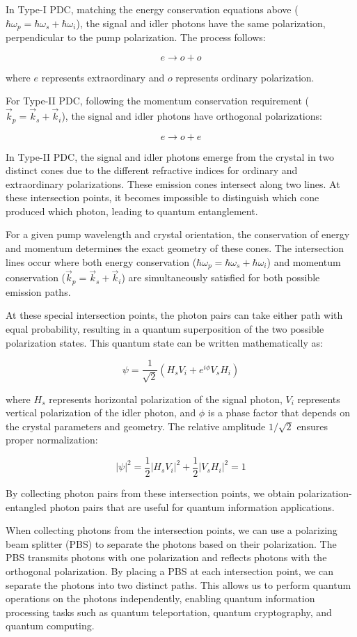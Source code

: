 \documentclass[
  a4paper,
]{book}
\begin{document}
In Type-I PDC, matching the energy conservation equations above
(\(\hbar\omega_p = \hbar\omega_s + \hbar\omega_i\)), the signal and
idler photons have the same polarization, perpendicular to the pump
polarization. The process follows:

\[
e \rightarrow o + o
\]

where \(e\) represents extraordinary and \(o\) represents ordinary
polarization.

For Type-II PDC, following the momentum conservation requirement
(\(\vec{k}_p = \vec{k}_s + \vec{k}_i\)), the signal and idler photons
have orthogonal polarizations:

\[
e \rightarrow o + e
\]

In Type-II PDC, the signal and idler photons emerge from the crystal in
two distinct cones due to the different refractive indices for ordinary
and extraordinary polarizations. These emission cones intersect along
two lines. At these intersection points, it becomes impossible to
distinguish which cone produced which photon, leading to quantum
entanglement.

For a given pump wavelength and crystal orientation, the conservation of
energy and momentum determines the exact geometry of these cones. The
intersection lines occur where both energy conservation
(\(\hbar\omega_p = \hbar\omega_s + \hbar\omega_i\)) and momentum
conservation (\(\vec{k}_p = \vec{k}_s + \vec{k}_i\)) are simultaneously
satisfied for both possible emission paths.

At these special intersection points, the photon pairs can take either
path with equal probability, resulting in a quantum superposition of the
two possible polarization states. This quantum state can be written
mathematically as:

\[
\psi = \frac{1}{\sqrt{2}}(H_s V_i + e^{i\phi} V_s H_i)
\]

where \(H_s\) represents horizontal polarization of the signal photon,
\(V_i\) represents vertical polarization of the idler photon, and
\(\phi\) is a phase factor that depends on the crystal parameters and
geometry. The relative amplitude \(1/\sqrt{2}\) ensures proper
normalization:

\[
|\psi|^2 = \frac{1}{2}|H_s V_i|^2 + \frac{1}{2}|V_s H_i|^2 = 1
\]

By collecting photon pairs from these intersection points, we obtain
polarization-entangled photon pairs that are useful for quantum
information applications.

When collecting photons from the intersection points, we can use a
polarizing beam splitter (PBS) to separate the photons based on their
polarization. The PBS transmits photons with one polarization and
reflects photons with the orthogonal polarization. By placing a PBS at
each intersection point, we can separate the photons into two distinct
paths. This allows us to perform quantum operations on the photons
independently, enabling quantum information processing tasks such as
quantum teleportation, quantum cryptography, and quantum computing.
\end{document}
